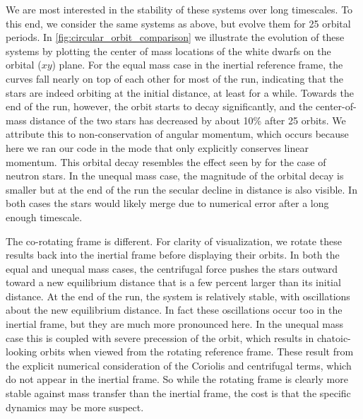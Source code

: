 \documentclass[12pt]{article}
\begin{document}


We are most interested in the stability of these systems over long
timescales. To this end, we consider the same systems as above, but
evolve them for 25 orbital periods. In 
\autoref{fig:circular_orbit_comparison} we illustrate the evolution of
these systems by plotting the center of mass locations of the white
dwarfs on the orbital ($xy$) plane. For the equal mass case in the
inertial reference frame, the curves fall nearly on top of each
other for most of the run, indicating that the stars are indeed 
orbiting at the initial distance, at least for a while. Towards the end 
of the run, however, the orbit starts to decay significantly, and the center-of-mass
distance of the two stars has decreased by about 10\% after 25 orbits.
We attribute this to non-conservation of angular momentum, which occurs 
because here we ran our code in the mode that  only explicitly conserves
linear momentum. This orbital decay resembles the effect seen by \citet{swc:2000}
for the case of neutron stars. In the unequal mass case, the magnitude of
the orbital decay is smaller but at the end of the run the secular decline
in distance is also visible. In both cases the stars would likely merge due
to numerical error after a long enough timescale.

The co-rotating frame is different.  For clarity of visualization, we
rotate these results back into the inertial frame before displaying
their orbits.  In both the equal and unequal mass cases, the centrifugal force 
pushes the stars outward toward a new equilibrium distance that is a few 
percent larger than its initial distance. At the end of the run, the system is 
relatively stable, with oscillations about the new equilibrium distance. In fact 
these oscillations occur too in the inertial frame, but they are much more pronounced 
here. In the unequal mass case this is coupled with severe precession of the orbit, 
which results in chatoic-looking orbits when viewed from the rotating reference frame. 
These result from the explicit numerical consideration of the Coriolis and centrifugal 
terms, which do not appear in the inertial frame. So while the rotating frame 
is clearly more stable against mass transfer than the inertial frame,
the cost is that the specific dynamics may be more suspect.
\end{document}
